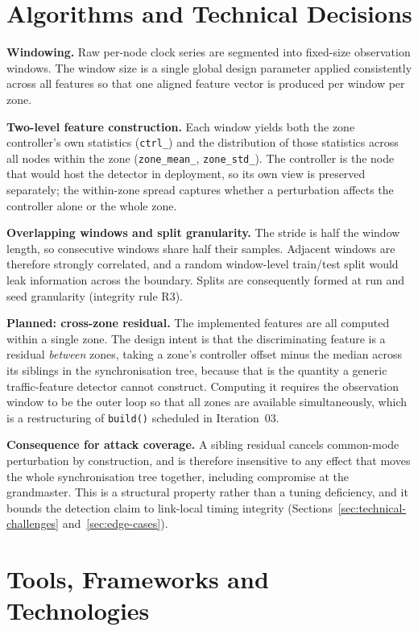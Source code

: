 \section{Algorithms and Technical Decisions}
\label{sec:algorithms}

\textbf{Windowing.} Raw per-node clock series are segmented into fixed-size
observation windows. The window size is a single global design parameter applied
consistently across all features so that one aligned feature vector is produced per
window per zone.

\textbf{Two-level feature construction.} Each window yields both the zone controller's
own statistics (\texttt{ctrl\_}) and the distribution of those statistics across all
nodes within the zone (\texttt{zone\_mean\_}, \texttt{zone\_std\_}). The controller is
the node that would host the detector in deployment, so its own view is preserved
separately; the within-zone spread captures whether a perturbation affects the
controller alone or the whole zone.

\textbf{Overlapping windows and split granularity.} The stride is half the window
length, so consecutive windows share half their samples. Adjacent windows are therefore
strongly correlated, and a random window-level train/test split would leak information
across the boundary. Splits are consequently formed at run and seed granularity
(integrity rule R3).

\textbf{Planned: cross-zone residual.} The implemented features are all computed within
a single zone. The design intent is that the discriminating feature is a residual
\emph{between} zones, taking a zone's controller offset minus the median across its
siblings in the synchronisation tree, because that is the quantity a generic traffic-feature
detector cannot construct. Computing it requires the observation window to be the outer
loop so that all zones are available simultaneously, which is a restructuring of
\texttt{build()} scheduled in Iteration~03.

\textbf{Consequence for attack coverage.} A sibling residual cancels common-mode
perturbation by construction, and is therefore insensitive to any effect that moves the
whole synchronisation tree together, including compromise at the grandmaster. This is
a structural property rather than a tuning deficiency, and it bounds the detection claim
to link-local timing integrity (Sections~\ref{sec:technical-challenges} and~\ref{sec:edge-cases}).

\section{Tools, Frameworks and Technologies}


